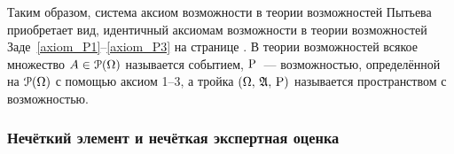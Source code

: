 Таким образом, система аксиом возможности в теории возможностей Пытьева приобретает вид, идентичный аксиомам возможности в теории возможностей Заде~\ref{axiom_P1}--\ref{axiom_P3} на странице \pageref{axiom_P1}. В теории возможностей всякое множество $A\in\Po(\Omega)$ называется событием, %
$\P$~--- возможностью, определённой на $\Po(\Omega)$ с помощью аксиом 1--3, а тройка $(\Omega,\, \Alg,\, \P)$ называется пространством с возможностью. %
\begin{comment}
\begin{compactenum}
\item\label{axiom_P1_Pyt} $\P(\varnothing) = 0$,
\item\label{axiom_P2_Pyt} $\P(\Omega) = 1$,
\item\label{axiom_P3_Pyt} $\P\Big(\bigcup\limits_{A\in\Alg} A\Big) = \sup\limits_{A\in\Alg}\P(A)$, для любого множества событий $\Alg\subset\Po(\Omega)$.
\end{compactenum}
\end{comment}



\subsubsection{Нечёткий элемент и нечёткая экспертная оценка}

